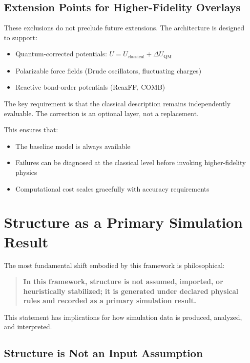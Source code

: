 \documentclass[11pt]{article}
\begin{document}
\subsection{Extension Points for Higher-Fidelity Overlays}

These exclusions do not preclude future extensions. The architecture is designed to support:

\begin{itemize}
\item Quantum-corrected potentials: $U = U_{\text{classical}} + \Delta U_{\text{QM}}$
\item Polarizable force fields (Drude oscillators, fluctuating charges)
\item Reactive bond-order potentials (ReaxFF, COMB)
\end{itemize}

The key requirement is that the classical description remains independently evaluable. The correction is an optional layer, not a replacement.

This ensures that:
\begin{itemize}
\item The baseline model is always available
\item Failures can be diagnosed at the classical level before invoking higher-fidelity physics
\item Computational cost scales gracefully with accuracy requirements
\end{itemize}

\section{Structure as a Primary Simulation Result}

The most fundamental shift embodied by this framework is philosophical:

\begin{quote}
\textbf{In this framework, structure is not assumed, imported, or heuristically stabilized; it is generated under declared physical rules and recorded as a primary simulation result.}
\end{quote}

This statement has implications for how simulation data is produced, analyzed, and interpreted.

\subsection{Structure is Not an Input Assumption}
\end{document}
